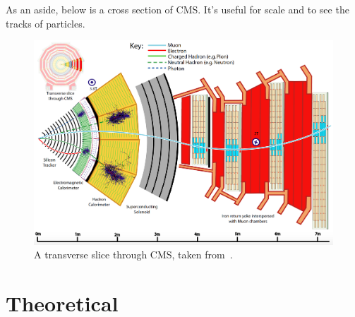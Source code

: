 As an aside, below is a cross section of CMS. It's useful for scale and to see the tracks of particles.

\begin{figure}[htbp]
\centering
\includegraphics[width=\textwidth]{figures/Transverse_slice_CMS.png}
\caption{A transverse slice through CMS, taken from~\cite{CMS-PRF-14-001}.}
\end{figure}


\section{Theoretical}

